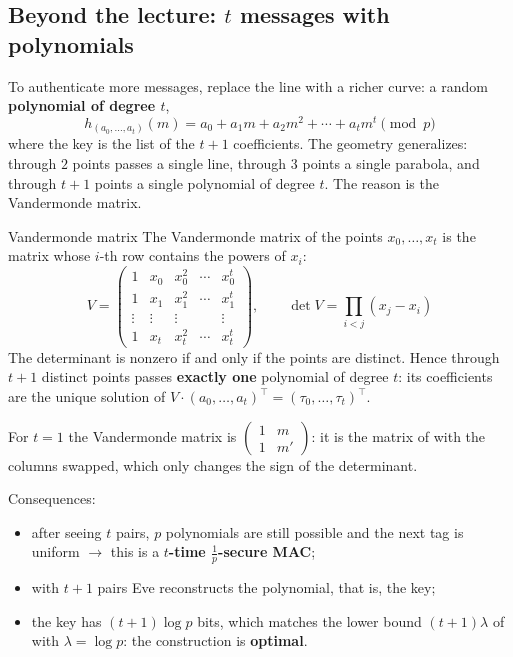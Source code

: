 \subsection{Beyond the lecture: $t$ messages with polynomials}

To authenticate more messages, replace the line with a richer curve: a random \textbf{polynomial of degree $t$},
\[
  h_{(a_0, \ldots, a_t)}(m) = a_0 + a_1 m + a_2 m^2 + \cdots + a_t m^t \pmod p
\]
where the key is the list of the $t+1$ coefficients. The geometry generalizes: through $2$ points passes a single line, through $3$ points a single parabola, and through $t+1$ points a single polynomial of degree $t$. The reason is the Vandermonde matrix.

\begin{frameddefn}{Vandermonde matrix}
  The Vandermonde matrix of the points $x_0, \ldots, x_t$ is the matrix whose $i$-th row contains the powers of $x_i$:
  \[
    V = \begin{pmatrix}
      1 & x_0 & x_0^2 & \cdots & x_0^t \\
      1 & x_1 & x_1^2 & \cdots & x_1^t \\
      \vdots & \vdots & \vdots & & \vdots \\
      1 & x_t & x_t^2 & \cdots & x_t^t
    \end{pmatrix},
    \qquad \det V = \prod_{i < j} (x_j - x_i)
  \]
  The determinant is nonzero if and only if the points are distinct. Hence through $t+1$ distinct points passes \textbf{exactly one} polynomial of degree $t$: its coefficients are the unique solution of $V \cdot (a_0, \ldots, a_t)^\top = (\tau_0, \ldots, \tau_t)^\top$.
\end{frameddefn}

For $t = 1$ the Vandermonde matrix is $\begin{pmatrix} 1 & m \\ 1 & m' \end{pmatrix}$: it is the matrix of  with the columns swapped, which only changes the sign of the determinant.

Consequences:
\begin{itemize}
  \item after seeing $t$ pairs, $p$ polynomials are still possible and the next tag is uniform $\to$ this is a \textbf{$t$-time $\frac{1}{p}$-secure MAC};
  \item with $t+1$ pairs Eve reconstructs the polynomial, that is, the key;
  \item the key has $(t+1)\log p$ bits, which matches the lower bound $(t+1)\lambda$ of  with $\lambda = \log p$: the construction is \textbf{optimal}.
\end{itemize}
